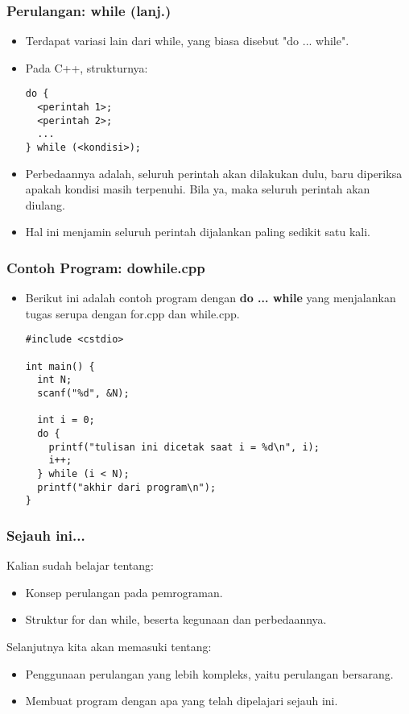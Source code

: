 \begin{frame}[fragile]
\frametitle{Perulangan: while (lanj.)}
\begin{itemize}
  \item Terdapat variasi lain dari while, yang biasa disebut "do ... while".
  \item Pada C++, strukturnya:
\begin{lstlisting}
do {
  <perintah 1>;
  <perintah 2>;
  ...
} while (<kondisi>);
\end{lstlisting}
  \item Perbedaannya adalah, seluruh perintah akan dilakukan dulu, baru diperiksa apakah kondisi masih terpenuhi. Bila ya, maka seluruh perintah akan diulang.
  \item Hal ini menjamin seluruh perintah dijalankan paling sedikit satu kali.  
\end{itemize}
\end{frame}

\begin{frame}[fragile]
\frametitle{Contoh Program: dowhile.cpp}
\begin{itemize}
  \item Berikut ini adalah contoh program dengan \textbf{do ... while} yang menjalankan tugas serupa dengan for.cpp dan while.cpp.
\begin{lstlisting}
#include <cstdio>

int main() {
  int N;
  scanf("%d", &N);

  int i = 0;
  do {
    printf("tulisan ini dicetak saat i = %d\n", i);
    i++;
  } while (i < N);
  printf("akhir dari program\n");
}
\end{lstlisting}
\end{itemize}
\end{frame}

\begin{frame}
\frametitle{Sejauh ini...}
Kalian sudah belajar tentang:
\begin{itemize}
  \item Konsep perulangan pada pemrograman.
  \item Struktur for dan while, beserta kegunaan dan perbedaannya.
\end{itemize}
Selanjutnya kita akan memasuki tentang:
\begin{itemize}
  \item Penggunaan perulangan yang lebih kompleks, yaitu perulangan bersarang.
  \item Membuat program dengan apa yang telah dipelajari sejauh ini.
\end{itemize}
\end{frame}


